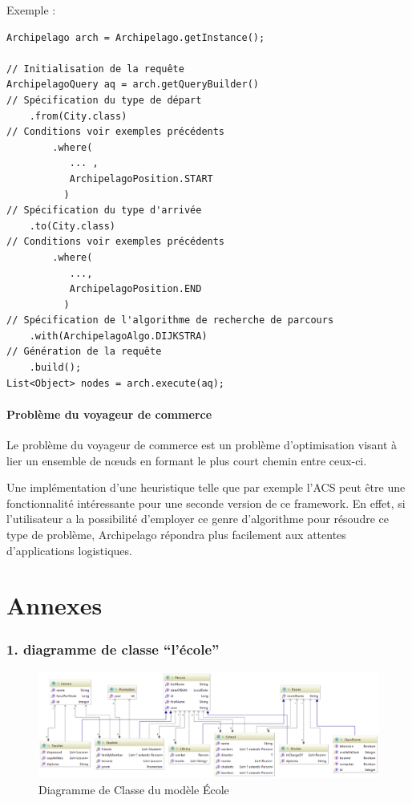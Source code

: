 \documentclass[a4paper,fleqn,12pt,oneside]{report}
\begin{document}
Exemple : 

\begin{lstlisting}
Archipelago arch = Archipelago.getInstance();

// Initialisation de la requête
ArchipelagoQuery aq = arch.getQueryBuilder()
// Spécification du type de départ
    .from(City.class)
// Conditions voir exemples précédents     
    	.where(
    	   ... ,
    	   ArchipelagoPosition.START
    	  )
// Spécification du type d'arrivée
    .to(City.class)
// Conditions voir exemples précédents  
    	.where(
    	   ...,
    	   ArchipelagoPosition.END
    	  )
// Spécification de l'algorithme de recherche de parcours
    .with(ArchipelagoAlgo.DIJKSTRA)
// Génération de la requête
    .build();
List<Object> nodes = arch.execute(aq);
\end{lstlisting}


\subsection*{Problème du voyageur de commerce}

Le problème du voyageur de commerce est un problème d'optimisation visant à lier un ensemble de nœuds en formant le plus court chemin entre ceux-ci.

Une implémentation d'une heuristique telle que par exemple l'ACS\cite{dorigo1997ant} peut être une fonctionnalité intéressante pour une seconde version de ce framework. En effet, si l'utilisateur a la possibilité d'employer ce genre d'algorithme pour résoudre ce type de problème, Archipelago répondra plus facilement aux attentes d'applications logistiques.



 

\part{Annexes}
\section*{1. diagramme de classe \enquote{l'école}}

\begin{figure}[!ht]
	\centering
    \includegraphics[angle=90,origin=c,scale=0.8]{figures/SchoolDiag.png}
    \caption{Diagramme de Classe du modèle École}
    \label{fig:SchoolDiagram}
\end{figure}
\end{document}
